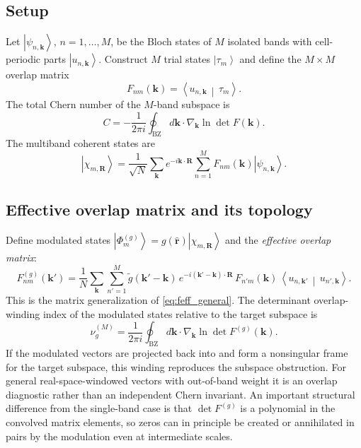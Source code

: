 \documentclass[aps,prb,onecolumn,nofootinbib,superscriptaddress]{revtex4-2}
\newcommand{\mbf}[1]{\mathbf{#1}}
\newcommand{\ket}[1]{\left|#1\right\rangle}
\newcommand{\braket}[2]{\left\langle#1\,\middle|\,#2\right\rangle}
\begin{document}
\subsection{Setup}

Let $\ket{\psi_{n,\mbf{k}}}$, $n=1,\ldots,M$, be the Bloch states of $M$ isolated bands with cell-periodic parts $\ket{u_{n,\mbf{k}}}$. Construct $M$ trial states $\ket{\tau_m}$ and define the $M\times M$ overlap matrix
\begin{equation}\label{eq:F_matrix}
F_{nm}(\mbf{k}) = \braket{u_{n,\mbf{k}}}{\tau_m}.
\end{equation}
The total Chern number of the $M$-band subspace is~\cite{Li2024}
\begin{equation}\label{eq:chern_det}
C = -\frac{1}{2\pi i}\oint_{\mathrm{BZ}} d\mbf{k}\cdot\nabla_{\mbf{k}} \ln \det F(\mbf{k}).
\end{equation}
The multiband coherent states are
\begin{equation}\label{eq:coherent_multi}
\ket{\chi_{m,\mbf{R}}} = \frac{1}{\sqrt{N}}\sum_{\mbf{k}} e^{-i\mbf{k}\cdot\mbf{R}} \sum_{n=1}^{M} F_{nm}(\mbf{k})\ket{\psi_{n,\mbf{k}}}.
\end{equation}

\subsection{Effective overlap matrix and its topology}

Define modulated states $\ket{\Phi^{(g)}_m} = g(\hat{\mbf{r}})\ket{\chi_{m,\mbf{R}}}$ and the \emph{effective overlap matrix}:
\begin{equation}\label{eq:Feff_general}
\boxed{F^{(g)}_{nm}(\mbf{k}') = \frac{1}{N}\sum_{\mbf{k}}\sum_{n'=1}^{M} \tilde{g}(\mbf{k}'-\mbf{k})\,e^{-i(\mbf{k}'-\mbf{k})\cdot\mbf{R}}\, F_{n'm}(\mbf{k})\,\braket{u_{n,\mbf{k}'}}{u_{n',\mbf{k}}}.}
\end{equation}
This is the matrix generalization of \eqref{eq:feff_general}. The determinant overlap-winding index of the modulated states relative to the target subspace is
\begin{equation}\label{eq:Cg_multi}
\nu_g^{(M)} = \frac{1}{2\pi i}\oint_{\mathrm{BZ}} d\mbf{k}\cdot\nabla_{\mbf{k}}\ln\det F^{(g)}(\mbf{k}).
\end{equation}
If the modulated vectors are projected back into and form a nonsingular frame for the target subspace, this winding reproduces the subspace obstruction.  For general real-space-windowed vectors with out-of-band weight it is an overlap diagnostic rather than an independent Chern invariant.  An important structural difference from the single-band case is that $\det F^{(g)}$ is a polynomial in the convolved matrix elements, so zeros can in principle be created or annihilated in pairs by the modulation even at intermediate scales.
\end{document}
